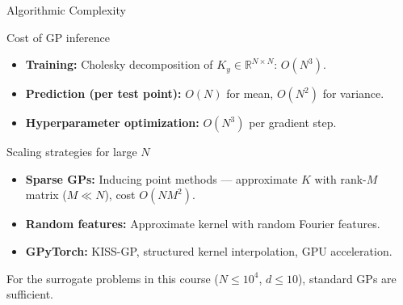 \documentclass[aspectratio=169,11pt]{beamer}
\newcommand{\emphc}[1]{\textcolor{harvardcrimson}{#1}}
\newcommand{\R}{\mathbb{R}}
\begin{document}
\begin{frame}[shrink=5]{Algorithmic Complexity}
\begin{block}{Cost of GP inference}
\begin{itemize}
  \item \textbf{Training:} Cholesky decomposition of $K_y \in \R^{N \times N}$: \emphc{$O(N^3)$}.
  \item \textbf{Prediction (per test point):} $O(N)$ for mean, $O(N^2)$ for variance.
  \item \textbf{Hyperparameter optimization:} $O(N^3)$ per gradient step.
\end{itemize}
\end{block}

\vspace{0.15cm}
\begin{block}{Scaling strategies for large $N$}
\begin{itemize}
  \item \textbf{Sparse GPs:} Inducing point methods --- approximate $K$ with rank-$M$ matrix ($M \ll N$), cost $O(NM^2)$.
  \item \textbf{Random features:} Approximate kernel with random Fourier features.
  \item \textbf{GPyTorch:} KISS-GP, structured kernel interpolation, GPU acceleration.
\end{itemize}
\end{block}

\vspace{0.1cm}
{\footnotesize For the surrogate problems in this course ($N \leq 10^4$, $d \leq 10$), standard GPs are sufficient.}
\end{frame}
\end{document}
